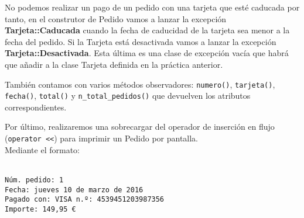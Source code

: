 No podemos realizar un pago de un pedido con una tarjeta que esté caducada por tanto, en el construtor de Pedido vamos a lanzar la excepción \textbf{Tarjeta::Caducada} cuando la fecha de caducidad de la tarjeta sea menor a la fecha del pedido. Si la Tarjeta está desactivada vamos a lanzar la excepción \textbf{Tarjeta::Desactivada}. Esta última es una clase de excepción vacía que habrá que añadir a la clase Tarjeta definida en la práctica anterior.

También contamos con varios métodos observadores: \texttt{numero()}, \texttt{tarjeta()}, \texttt{fecha()}, \texttt{total()} y \texttt{n\_total\_pedidos()} que devuelven los atributos correspondientes.

Por último, realizaremos una sobrecargar del operador de inserción en flujo (\texttt{operator <<}) para imprimir un Pedido por pantalla.\\
Mediante el formato:

\texttt{\\
Núm. pedido: 1\\
Fecha: jueves 10 de marzo de 2016\\
Pagado con: VISA n.º: 4539451203987356\\
Importe: 149,95 €\\
}
